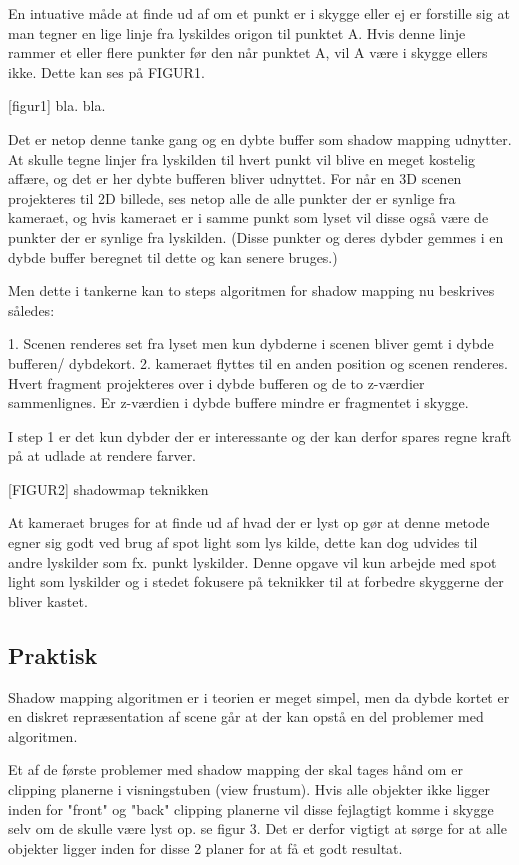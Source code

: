 \documentclass[11pt,a4paper]{article}
\begin{document}
En intuative måde at finde ud af om et punkt er i skygge eller ej er forstille sig at man tegner en lige linje fra lyskildes origon til punktet A. Hvis denne linje rammer et eller flere punkter før den når punktet A, vil A være i  skygge ellers ikke. Dette kan ses på FIGUR1.

[figur1]
bla. bla.

Det er netop denne tanke gang og en dybte buffer som shadow mapping udnytter. At skulle tegne linjer fra lyskilden til hvert punkt vil blive en meget kostelig affære, og det er her dybte bufferen bliver udnyttet. For når en 3D scenen projekteres til 2D billede, ses netop alle de alle punkter der er synlige fra kameraet, og hvis kameraet er i samme punkt som lyset vil disse også være de punkter der er synlige fra lyskilden. (Disse punkter og deres dybder gemmes i en dybde buffer beregnet til dette og kan senere bruges.)

Men dette i tankerne kan to steps algoritmen for shadow mapping nu beskrives således:

1. Scenen renderes set fra lyset men kun dybderne i scenen bliver gemt i dybde bufferen/ dybdekort.
2. kameraet flyttes til en anden position og scenen renderes. Hvert fragment projekteres over i dybde bufferen og de to z-værdier sammenlignes. Er z-værdien i dybde buffere mindre er fragmentet i skygge.

I step 1 er det kun dybder der er interessante og der kan derfor spares regne kraft på at udlade at rendere farver.

[FIGUR2] shadowmap teknikken


At kameraet bruges for at finde ud af hvad der er lyst op gør at denne metode egner sig godt ved brug af spot light som lys kilde, dette kan dog udvides til andre lyskilder som fx. punkt lyskilder. Denne opgave vil kun arbejde med spot light som lyskilder og i stedet fokusere på teknikker til at forbedre skyggerne der bliver kastet.  




\subsection{Praktisk}


Shadow mapping algoritmen er i teorien er meget simpel, men da dybde kortet er en diskret repræsentation af scene går at der kan opstå en del problemer med algoritmen. 

Et af de første problemer med shadow mapping der skal tages hånd om er clipping planerne i visningstuben (view frustum). Hvis alle objekter ikke ligger inden for "front"  og "back" clipping planerne vil disse fejlagtigt komme i skygge selv om de skulle være lyst op. se figur 3. Det er derfor vigtigt at sørge for at alle objekter ligger inden for disse 2 planer for at få et godt resultat. 
\end{document}
